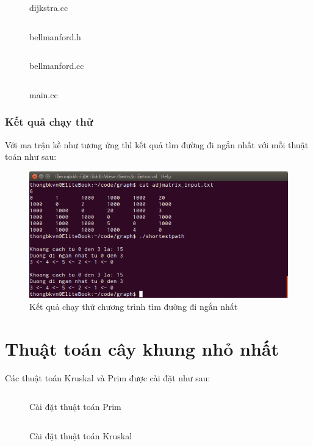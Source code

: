 \documentclass[a4paper,10pt]{article}
\newcommand{\mnt}[1]{\inputminted[frame=single, linenos=true, tabsize=4]{c++}{#1}}
\begin{document}
\begin{figure}[h!]
  \centering
  \mnt{images/dijkstra.cc}
  \caption{dijkstra.cc}
\end{figure}

\begin{figure}[h!]
  \centering
  \mnt{images/bellmanford.h}
  \caption{bellmanford.h}
\end{figure}

\begin{figure}[h!]
  \centering
  \mnt{images/bellmanford.cc}
  \caption{bellmanford.cc}
\end{figure}

\begin{figure}[h!]
  \centering
  \mnt{images/main.cc}
  \caption{main.cc}
\end{figure}


\subsubsection{Kết quả chạy thử}
Với ma trận kề như tương ứng thì kết quả tìm đường đi ngắn nhất với mỗi thuật toán như sau:
\begin{figure}[h!]
  \centering
  \includegraphics[scale=0.5]{images/pic8.png}
  \caption{Kết quả chạy thử chương trình tìm đường đi ngắn nhất}
\end{figure}

\section{Thuật toán cây khung nhỏ nhất}
Các thuật toán Kruskal và Prim được cài đặt như sau:
\begin{figure}[h!]
  \centering
  \mnt{images/prim.cc}
  \caption{Cài đặt thuật toán Prim}
\end{figure}

\begin{figure}[h!]
  \centering
  \mnt{images/kruskal.cc}
  \caption{Cài đặt thuật toán Kruskal }
\end{figure}
\end{document}
